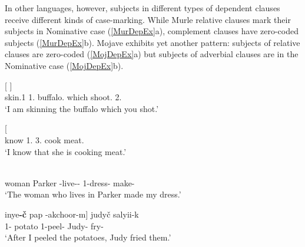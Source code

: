 In other languages, however, subjects in different types of dependent clauses receive different kinds of case-marking.
While Murle relative clauses mark their subjects in Nominative  case (\ref{MurDepEx}a), complement clauses have zero-coded subjects (\ref{MurDepEx}b).
Mojave exhibits yet another pattern: subjects of relative clauses are zero-coded (\ref{MojDepEx}a) but subjects of adverbial clauses are in the Nominative  case (\ref{MojDepEx}b). 

\begin{exe}\ex\label{MurDepEx}
\begin{xlist}
\ex\gll{}    {\rm[}  \textbf{}{\rm]}\\
skin.1\sg{} 1\sg{}.\nom{} buffalo.\acc{} \hspaceThis{[}which shoot.\pst{} 2\sg{}.\nom{}\\
\glt `I am skinning the buffalo which you shot.'

\ex\gll{}   {\rm[}\textbf{}  \textipa{idiN}{\rm]}\\
know 1\sg{}.\nom{} \hspaceThis{[}3\sg{}.\acc{} cook meat.\acc{}\\
\glt `I know that she is cooking meat.'
\end{xlist}

\ex\label{MojDepEx}
\begin{xlist}
\ex\gll  {\rm[}\textbf{}  \textipa{k\super{w}-n\super{y}avay{\rm]}-n\super{y}-\v c}  \\
\hspaceThis{[}woman Parker \relativ{}-live-\dem{}-\nom{} 1-dress-\dem{} make-\tns{}\\
\glt `The woman who lives in Parker made my dress.'

\ex\gll  {\rm[}\textglotstop inye\textbf{-\v c} pap \textglotstop-akchoor-m{\rm]} judy\v c salyii-k\\
\hspaceThis{[}1\sg{}-\nom{} potato 1-peel-\dsbj{} Judy-\nom{} fry-\tns{}\\
\glt `After I peeled the potatoes, Judy fried them.' %
\end{xlist}
\end{exe}

